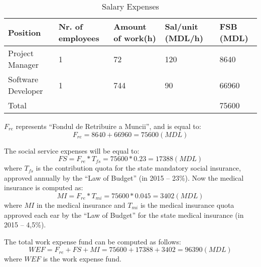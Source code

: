 \begin{table}[ht!]
\centering
\caption{Salary Expenses}
{
\renewcommand{\arraystretch}{1.25}
\begin{tabular}{ lllll }
\hline
  Position &  Nr. of employees & Amount of work(h) & Sal/unit (MDL/h) & FSB (MDL) \\ \hline
  Project Manager & 1 & 72 & 120 & 8640 \\
  Software Developer & 1 & 744 & 90 & 66960 \\
  Total & & & & 75600 \\
\hline
\end{tabular}
}
\label{salary_expenses}
\end{table}


$F_{re}$ represents “Fondul de Retribuire a Muncii”, and is equal to: 
\begin{equation}
  F_{re} = 8640 + 66960 = 75600 (MDL) \label{4.2}
\end{equation}

The social service expenses will be equal to:
\begin{equation}
  FS = F_{re} * T_{fs} = 75600 * 0.23 = 17388 (MDL) \label{4.3}
\end{equation}
where $T_{fs}$ is the contribution quota for the state mandatory social insurance, approved annually by the “Law of Budget” (in 2015 – 23\%). Now the medical insurance is computed as:
\begin{equation}
  MI = F_{re} * T_{mi} = 75600 * 0.045 = 3402 (MDL) \label{4.4}
\end{equation}
where $MI$ in the medical insurance and $T_{mi}$ is the medical insurance quota approved each ear by the “Law of Budget” for the state medical insurance (in 2015 – 4,5\%).

The total work expense fund can be computed as follows:
\begin{equation}
  WEF = F_{re} + FS + MI = 75600 + 17388 + 3402 = 96390 (MDL) \label{4.5}
\end{equation}
where $WEF$ is the work expense fund.
